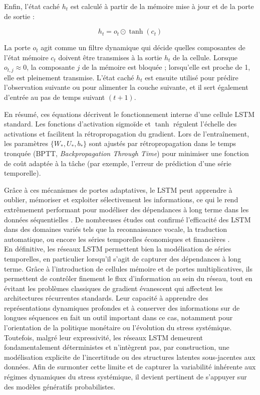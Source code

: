 Enfin, l’état caché $h_t$ est calculé à partir de la mémoire mise à jour et de la porte de sortie :

\begin{equation}
h_t = o_t \odot \tanh(c_t) 
\end{equation}

La porte $o_t$ agit comme un filtre dynamique qui décide quelles composantes de l’état mémoire $c_t$ doivent être transmises à la sortie $h_t$ de la cellule. Lorsque $o_{t,j} \approx 0$, la composante $j$ de la mémoire est bloquée ; lorsqu’elle est proche de 1, elle est pleinement transmise. L’état caché $h_t$ est ensuite utilisé pour prédire l’observation suivante ou pour alimenter la couche suivante, et il sert également d’entrée au pas de temps suivant $(t+1)$. 

En résumé, ces équations décrivent le fonctionnement interne d’une cellule LSTM standard. Les fonctions d’activation sigmoïde et $\tanh$ régulent l’échelle des activations et facilitent la rétropropagation du gradient. Lors de l'entraînement, les paramètres $\{W_*, U_*, b_*\}$ sont ajustés par rétropropagation dans le temps tronquée (BPTT, \textit{Backpropagation Through Time}) pour minimiser une fonction de coût adaptée à la tâche (par exemple, l’erreur de prédiction d’une série temporelle).

Grâce à ces mécanismes de portes adaptatives, le LSTM peut apprendre à oublier, mémoriser et exploiter sélectivement les informations, ce qui le rend extrêmement performant pour modéliser des dépendances à long terme dans les données séquentielles \citep{greff2017lstm}. De nombreuses études ont confirmé l’efficacité des LSTM dans des domaines variés tels que la reconnaissance vocale, la traduction automatique, ou encore les séries temporelles économiques et financières \citep{greff2017lstm}.\\

En définitive, les réseaux LSTM permettent bien la modélisation de séries temporelles, en particulier lorsqu’il s’agit de capturer des dépendances à long terme. Grâce à l’introduction de cellules mémoire et de portes multiplicatives, ils permettent de contrôler finement le flux d’information au sein du réseau, tout en évitant les problèmes classiques de gradient évanescent qui affectent les architectures récurrentes standards. Leur capacité à apprendre des représentations dynamiques profondes et à conserver des informations sur de longues séquences en fait un outil important dans ce cas, notamment pour l’orientation de la politique monétaire ou l’évolution du stress systémique. Toutefois, malgré leur expressivité, les réseaux LSTM demeurent fondamentalement déterministes et n’intègrent pas, par construction, une modélisation explicite de l’incertitude ou des structures latentes sous-jacentes aux données. Afin de surmonter cette limite et de capturer la variabilité inhérente aux régimes dynamiques du stress systémique, il devient pertinent de s’appuyer sur des modèles génératifs probabilistes. 

